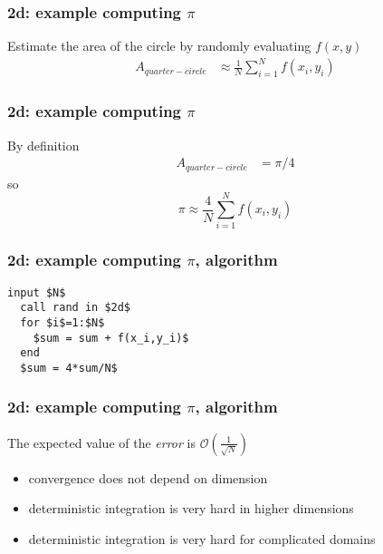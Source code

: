 \documentclass[10pt]{beamer}
\newcommand{\mO}{{\mathcal{O}}}
\begin{document}
\begin{frame}
\frametitle{2d: example computing $\pi$}
Estimate the area of the circle by randomly evaluating $f(x,y)$
\begin{align*}
  A_{quarter-circle} &\approx \frac{1}{N}\sum_{i=1}^{N}f(x_i,y_i)
\end{align*}
\begin{center}
\end{center}
\end{frame}
\begin{frame}
\frametitle{2d: example computing $\pi$}
By definition
\begin{align*}
  A_{quarter-circle} & = \pi/4
\end{align*}
so
\begin{equation*}
  \pi \approx \frac{4}{N} \sum_{i=1}^{N}f(x_i,y_i)
\end{equation*}
\end{frame}
\begin{frame}[fragile]
\frametitle{2d: example computing $\pi$, algorithm}
\begin{lstlisting}[mathescape]
  input $N$
  call rand in $2d$
  for $i$=1:$N$
    $sum = sum + f(x_i,y_i)$
  end
  $sum = 4*sum/N$
\end{lstlisting}
\end{frame}
\begin{frame}
\frametitle{2d: example computing $\pi$, algorithm}
The expected value of the \emph{error} is $\mO\left(\frac{1}{\sqrt{N}}\right)$
\begin{itemize}
  \item convergence does not depend on dimension
  \item deterministic integration is very hard in higher dimensions
  \item deterministic integration is very hard for complicated domains
\end{itemize}
\end{frame}
\end{document}
